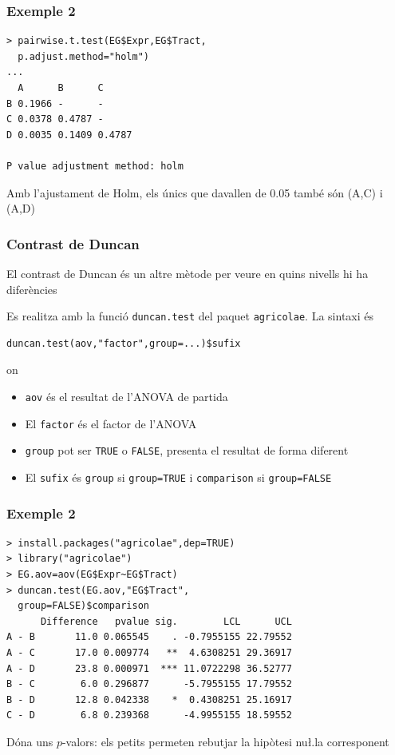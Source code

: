 \documentclass[12pt,t]{beamer}
\renewcommand{\emph}[1]{{\color{red}#1}}
\theoremstyle{plain}
\theoremstyle{definition}
\begin{document}
\begin{frame}[fragile]
\frametitle{Exemple 2}
\vspace*{-3ex}

\begin{verbatim}
> pairwise.t.test(EG$Expr,EG$Tract,
  p.adjust.method="holm")
...
  A      B      C     
B 0.1966 -      -     
C 0.0378 0.4787 -     
D 0.0035 0.1409 0.4787

P value adjustment method: holm 
\end{verbatim}
Amb l'ajustament de Holm, els únics que davallen de 0.05 també són (A,C) i (A,D)

\end{frame}



\begin{frame}[fragile]
\frametitle{Contrast de Duncan}
El \emph{contrast de Duncan} és un altre mètode per veure en quins nivells hi ha
diferències
\medskip

Es realitza amb la funció \texttt{duncan.test} del paquet \texttt{agricolae}. La sintaxi és
\begin{verbatim}
duncan.test(aov,"factor",group=...)$sufix
\end{verbatim}
on
\begin{itemize}
\item \texttt{aov} és el resultat de l'ANOVA de partida
\item El \texttt{factor} és el factor de l'ANOVA
\item \texttt{group} pot ser \texttt{TRUE} o \texttt{FALSE}, presenta el resultat de forma diferent
\item El \texttt{sufix} és \texttt{group} si \texttt{group=TRUE} i \texttt{comparison} si \texttt{group=FALSE}
\end{itemize}
\end{frame}


\begin{frame}[fragile]
\frametitle{Exemple 2}
\vspace*{-3ex}

{\small 
\begin{verbatim}
> install.packages("agricolae",dep=TRUE)
> library("agricolae")
> EG.aov=aov(EG$Expr~EG$Tract)
> duncan.test(EG.aov,"EG$Tract",
  group=FALSE)$comparison
      Difference   pvalue sig.        LCL      UCL
A - B       11.0 0.065545    . -0.7955155 22.79552
A - C       17.0 0.009774   **  4.6308251 29.36917
A - D       23.8 0.000971  *** 11.0722298 36.52777
B - C        6.0 0.296877      -5.7955155 17.79552
B - D       12.8 0.042338    *  0.4308251 25.16917
C - D        6.8 0.239368      -4.9955155 18.59552
\end{verbatim}
}
Dóna uns $p$-valors: els petits permeten rebutjar la hipòtesi nu\l.la corresponent
\end{frame}
\end{document}
